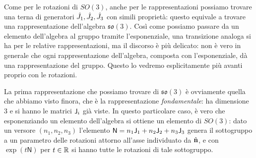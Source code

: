 Come per le rotazioni di $SO(3)$, anche per le rappresentazioni possiamo trovare una terna di generatori $\hat{J}_1,\hat{J}_2,\hat{J}_3$ con simili proprietà: questo equivale a trovare una rappresentazione dell'algebra $\mathfrak{so}(3)$.
Cos\`i come possiamo passare da un elemento dell'algebra al gruppo tramite l'esponenziale, una transizione analoga si ha per le relative rappresentazioni, ma il discorso è più delicato: non è vero in generale che ogni rappresentazione dell'algebra, composta con l'esponenziale, dà una rappresentazione del gruppo.
Questo lo vedremo esplicitamente più avanti proprio con le rotazioni.

La prima rappresentazione che possiamo trovare di $\mathfrak{so}(3)$ è ovviamente quella che abbiamo visto finora, che è la rappresentazione \emph{fondamentale}: ha dimensione 3 e si hanno le matrici $\mathsf{J}_i$ già viste.
In questo particolare caso, è vero che esponenziando un elemento dell'algebra si ottiene un elemento di $SO(3)$: dato un versore $(n_1,n_2,n_3)$ l'elemento $\mathsf N=n_1\mathsf{J}_1+n_2\mathsf{J}_2+n_3\mathsf{J}_3$ genera il sottogruppo a un parametro delle rotazioni attorno all'asse individuato da $\hat{\mathbf{n}}$, e con $\exp(t\mathsf N)$ per $t\in\mathbb{R}$ si hanno tutte le rotazioni di tale sottogruppo.

